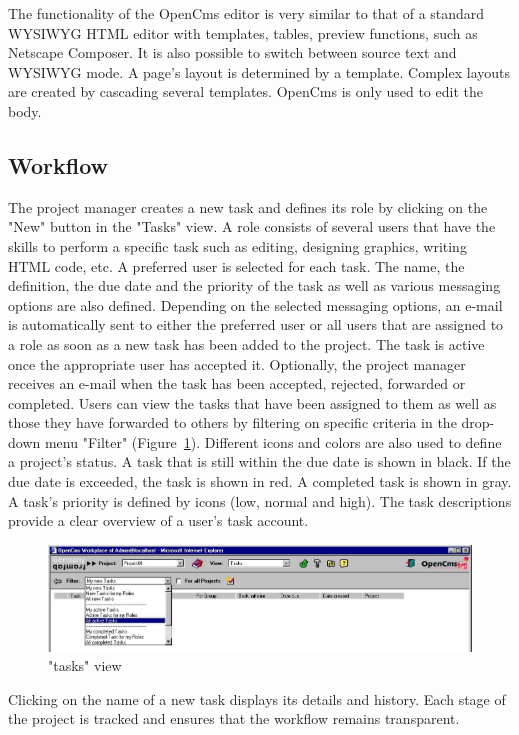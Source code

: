 The functionality of the OpenCms editor is very similar to that of
a standard WYSIWYG HTML editor with templates, tables, preview
functions, such as Netscape Composer. It is also possible to
switch between source text and WYSIWYG mode. A page's layout is
determined by a template. Complex layouts are created by cascading
several templates. OpenCms is only used to edit the body.

\subsection{Workflow}

The project manager creates a new task and defines its role by
clicking on the "New" button in the "Tasks" view. A role consists
of several users that have the skills to perform a specific task
such as editing, designing graphics, writing HTML code, etc. A
preferred user is selected for each task. The name, the
definition, the due date and the priority of the task as well as
various messaging options are also defined. Depending on the
selected messaging options, an e-mail is automatically sent to
either the preferred user or all users that are assigned to a role
as soon as a new task has been added to the project. The task is
active once the appropriate user has accepted it. Optionally, the
project manager receives an e-mail when the task has been
accepted, rejected, forwarded or completed. Users can view the
tasks that have been assigned to them as well as those they have
forwarded to others by filtering on specific criteria in the
drop-down menu "Filter" (Figure~\ref{taskview}). Different icons
and colors are also used to define a project's status. A task that
is still within the due date is shown in black. If the due date is
exceeded, the task is shown in red. A completed task is shown in
gray. A task's priority is defined by icons (low, normal and
high). The task descriptions provide a clear overview of a user's
task account.

\begin{figure}[hbt]
\begin{center}
\includegraphics[width=\sgw]
                   {pics/usermanual/taskView}
\caption["tasks" view]
           {"tasks" view}
\label{taskview}
\end{center}
\end{figure}

Clicking on the name of a new task displays its details and
history. Each stage of the project is tracked and ensures that the
workflow remains transparent.
